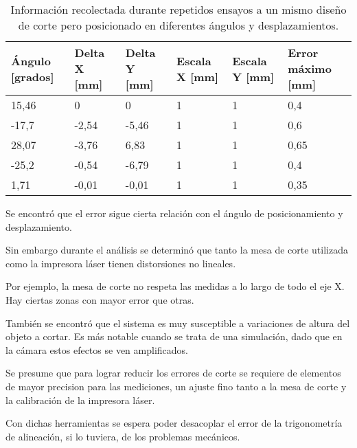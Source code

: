       \begin{table}[!ht]
         \centering
         \caption[Ensayos de corte simulado]{Información recolectada durante repetidos ensayos a un mismo diseño de corte pero posicionado en diferentes ángulos y desplazamientos.}
         \begin{tabular}[!ht]{m{1.6cm}m{1.6cm}m{1.6cm}m{1.6cm}m{1.6cm}m{1.6cm}}
            \toprule
            \textbf{Ángulo [grados]} & \textbf{Delta X [mm]} & \textbf{Delta Y [mm]} & \textbf{Escala X [mm]} & \textbf{Escala Y [mm]} & \textbf{Error máximo [mm]}\\
            \midrule
            15,46 & 0     & 0     & 1 & 1 & 0,4\\
            -17,7 & -2,54 & -5,46 & 1 & 1 & 0,6\\
            28,07 & -3,76 & 6,83  & 1 & 1 & 0,65\\
            -25,2 & -0,54 & -6,79 & 1 & 1 & 0,4\\
            1,71  & -0,01 & -0,01 & 1 & 1 & 0,35\\
            \bottomrule
         \end{tabular}
         \label{tbl:ensayo_A}
      \end{table}

         Se encontró que el error sigue cierta relación con el ángulo de posicionamiento y desplazamiento.\par
      Sin embargo durante el análisis se determinó que tanto la mesa de corte utilizada como la impresora láser tienen distorsiones no lineales.\par
      Por ejemplo, la mesa de corte no respeta las medidas a lo largo de todo el eje X. Hay ciertas zonas con mayor error que otras.\par

      También se encontró que el sistema es muy susceptible a variaciones de altura del objeto a cortar. Es más notable cuando se trata de una simulación, dado que en la cámara estos efectos se ven amplificados.\par

      Se presume que para lograr reducir los errores de corte se requiere de elementos de mayor precision para las mediciones, un ajuste fino tanto a la mesa de corte y la calibración de la impresora láser.\par

   Con dichas herramientas se espera poder desacoplar el error de la trigonometría de alineación, si lo tuviera, de los problemas mecánicos. \par



